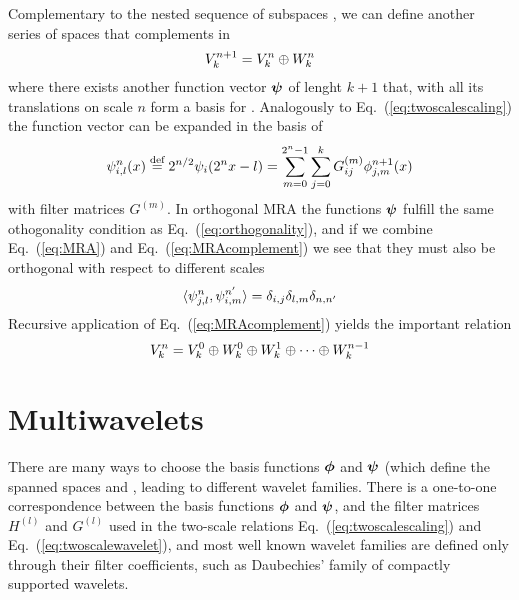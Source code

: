 Complementary to the nested sequence of subspaces , we can define 
another series of spaces  that complements  in 
\begin{equation}
    \label{eq:MRAcomplement}
    {V}_{k}^{n+1} = {V}_{k}^{n} \oplus {W}_{k}^{n}
\end{equation}
where there exists another function vector $\boldsymbol{\psi}$ of lenght $k+1$ that, with 
all its translations on scale $n$ form a basis for .
Analogously to Eq.~(\ref{eq:twoscalescaling}) the function vector can be expanded 
in the basis of 
\begin{equation}
    \label{eq:twoscalewavelet}
    \psi^n_{i,l}(x) \stackrel{\text{def}}{\hbox{=}} 2^{n/2}\psi_i(2^nx-l) = 
	\sum_{m=0}^{2^n-1} \sum_{j=0}^k G_{ij}^{(m)}\phi_{j,m}^{n+1}(x)
\end{equation}
with filter matrices $G^{(m)}$. In orthogonal MRA the functions $\boldsymbol{\psi}$ fulfill 
the same othogonality condition as Eq.~(\ref{eq:orthogonality}), and if we combine 
Eq.~(\ref{eq:MRA}) and Eq.~(\ref{eq:MRAcomplement}) we see that they must also be 
orthogonal with respect to different scales
\begin{equation}
    \langle \psi_{j,l}^n, \psi_{i,m}^{n'} \rangle = 
	\delta_{i,j}\delta_{l,m}\delta_{n,n'}
\end{equation}
Recursive application of Eq.~(\ref{eq:MRAcomplement}) yields the important relation
\begin{equation}
    \label{eq:MRArecursive}
    {V}_{k}^{n} = {V}_{k}^{0} \oplus {W}_{k}^{0} \oplus {W}_{k}^{1}
	\oplus \cdots \oplus {W}_{k}^{n-1}
\end{equation}

\section{Multiwavelets}
There are many ways to choose the basis functions $\boldsymbol{\phi}$ and $\boldsymbol{\psi}$ 
(which define the spanned spaces  and ,
leading to different wavelet families. There is a one-to-one correspondence between 
the basis functions $\boldsymbol{\phi}$ and $\boldsymbol{\psi}$, and the filter matrices $H^{(l)}$ 
and $G^{(l)}$ used in the two-scale relations Eq.~(\ref{eq:twoscalescaling}) and 
Eq.~(\ref{eq:twoscalewavelet}), and most well known wavelet families are defined 
only through their filter coefficients, such as Daubechies' family of compactly
supported wavelets\cite{Daubechies:1988}.


